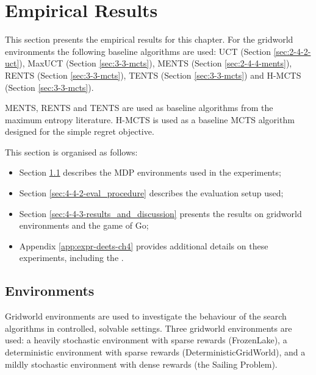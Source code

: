 \section{Empirical Results}
\label{sec:4-4-results}

    This section presents the empirical results for this chapter. For the gridworld environments the following baseline algorithms are used: UCT (Section \ref{sec:2-4-2-uct}), MaxUCT (Section \ref{sec:3-3-mcts}), MENTS (Section \ref{sec:2-4-4-ments}), RENTS (Section \ref{sec:3-3-mcts}), TENTS (Section \ref{sec:3-3-mcts}) and H-MCTS (Section \ref{sec:3-3-mcts}).

    MENTS, RENTS and TENTS are used as baseline algorithms from the maximum entropy literature. H-MCTS is used as a baseline MCTS algorithm designed for the simple regret objective.

    This section is organised as follows:
    \begin{itemize}
        \item Section \ref{sec:4-4-1-envs} describes the MDP environments used in the experiments;
        \item Section \ref{sec:4-4-2-eval_procedure} describes the evaluation setup used;
        \item Section \ref{sec:4-4-3-results_and_discussion} presents the results on gridworld environments and the game of Go;
        \item Appendix \ref{app:expr-deets-ch4} provides additional details on these experiments, including the .
    \end{itemize}













\subsection{Environments}
\label{sec:4-4-1-envs}

    Gridworld environments are used to investigate the behaviour of the search algorithms in controlled, solvable settings. Three gridworld environments are used: a heavily stochastic environment with sparse rewards (FrozenLake), a deterministic environment with sparse rewards (DeterministicGridWorld), and a mildly stochastic environment with dense rewards (the Sailing Problem).
    


